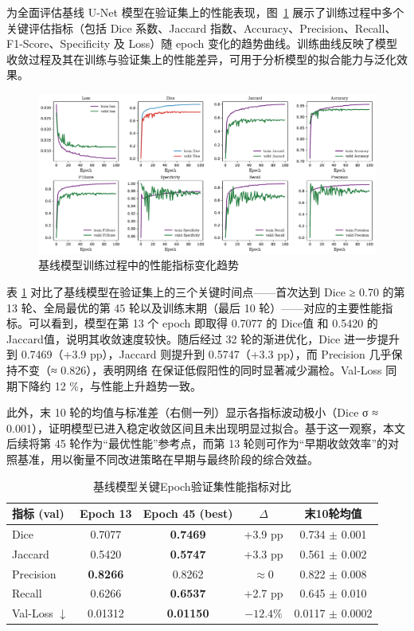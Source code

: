 为全面评估基线 U-Net 模型在验证集上的性能表现，图~\ref{fig:base_unet_metrics} 展示了训练过程中多个关键评估指标（包括 Dice 系数、Jaccard 指数、Accuracy、Precision、Recall、F1-Score、Specificity 及 Loss）随 epoch 变化的趋势曲线。训练曲线反映了模型收敛过程及其在训练与验证集上的性能差异，可用于分析模型的拟合能力与泛化效果。

\begin{figure}[!htbp]
    \centering
    \includegraphics[width=\textwidth]{fig/base_unet_metrics.pdf}
    \caption{基线模型训练过程中的性能指标变化趋势}
    \label{fig:base_unet_metrics}
\end{figure}

表 \ref{tab:unet_epoch_compare} 对比了基线模型在验证集上的三个关键时间点——首次达到 Dice ≥ 0.70 的第 13 轮、全局最优的第 45 轮以及训练末期（最后 10 轮）——对应的主要性能指标。可以看到，模型在第 13 个 epoch 即取得 0.7077 的 Dice值 和 0.5420 的 Jaccard值，说明其收敛速度较快。随后经过 32 轮的渐进优化，Dice 进一步提升到 0.7469（+3.9 pp），Jaccard 则提升到 0.5747（+3.3 pp），而 Precision 几乎保持不变（≈ 0.826），表明网络 在保证低假阳性的同时显著减少漏检。Val-Loss 同期下降约 12 \%，与性能上升趋势一致。

此外，末 10 轮的均值与标准差（右侧一列）显示各指标波动极小（Dice σ ≈ 0.001），证明模型已进入稳定收敛区间且未出现明显过拟合。基于这一观察，本文后续将第 45 轮作为“最优性能”参考点，而第 13 轮则可作为“早期收敛效率”的对照基准，用以衡量不同改进策略在早期与最终阶段的综合效益。

\begin{table}[htbp]
    \centering
    \caption{基线模型关键Epoch验证集性能指标对比}
    \label{tab:unet_epoch_compare}
    \begin{tabular}{lcccc}
        \toprule
        指标 (val) & Epoch 13 & Epoch 45 (best) & $\Delta$ & 末10轮均值 \\
        \midrule
        Dice        & 0.7077 & \textbf{0.7469} & +3.9 pp   & 0.734 $\pm$ 0.001 \\
        Jaccard     & 0.5420 & \textbf{0.5747} & +3.3 pp   & 0.561 $\pm$ 0.002 \\
        Precision   & \textbf{0.8266} & 0.8262 & $\approx$0 & 0.822 $\pm$ 0.008 \\
        Recall      & 0.6266 & \textbf{0.6537} & +2.7 pp   & 0.645 $\pm$ 0.010 \\
        Val-Loss $\downarrow$ & 0.01312 & \textbf{0.01150} & $-12.4\%$ & 0.0117 $\pm$ 0.0002 \\
        \bottomrule
    \end{tabular}
\end{table}

